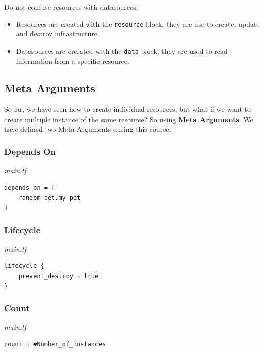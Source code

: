 \documentclass{article}
\newenvironment{blocktemplateI}[1]{%
    \tcolorbox[beamer,%
    noparskip,breakable,
    colframe=Violet,%
    colbacklower=Black,%
    title=#1]}%
    {\endtcolorbox}
\newenvironment{codetemplate}[1][]{%
  \mybasecolorbox[#1]
  \itshape
}{%
  \endmybasecolorbox
}
\begin{document}
\begin{blocktemplateI}{Note}
Do not confuse resources with datasources! 
\begin{itemize}
    \item Resources are created with the \verb+resource+ block, they are use to create, update and destroy infrastructure.
    \item Datasources are crerated with the \verb+data+ block, they are used to read information from a specific resource.
\end{itemize}
\end{blocktemplateI}


\subsection{Meta Arguments}
So far, we have seen how to create individual resources, but what if we want to create multiple instance of the same resource? So using \textbf{Meta Arguments}. We have defined two Meta Arguments during this course:

\subsubsection{Depends On}
\begin{codetemplate}{main.tf}
\begin{verbatim}
depends_on = [
    random_pet.my-pet
]
\end{verbatim}
\end{codetemplate}

\subsubsection{Lifecycle}
\begin{codetemplate}{main.tf}
\begin{verbatim}
lifecycle {
    prevent_destroy = true
}
\end{verbatim}
\end{codetemplate}

\subsubsection{Count}

\begin{codetemplate}{main.tf}
\begin{verbatim}
count = #Number_of_instances
\end{verbatim}
\end{codetemplate}
\end{document}
